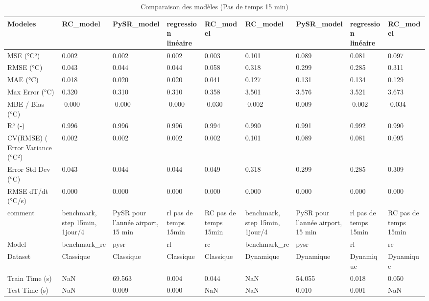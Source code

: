 \begin{table}
\caption{Comparaison des modèles (Pas de temps 15 min)}
\label{tab:tableau_15min}
\begin{tabular}{lllllllll}
\toprule
Modeles & RC_model & PySR_model & regression linéaire & RC_model & RC_model & PySR_model & regression linéaire & RC_model \\
\midrule
MSE (°C²) & 0.002 & 0.002 & 0.002 & 0.003 & 0.101 & 0.089 & 0.081 & 0.097 \\
RMSE (°C) & 0.043 & 0.044 & 0.044 & 0.058 & 0.318 & 0.299 & 0.285 & 0.311 \\
MAE (°C) & 0.018 & 0.020 & 0.020 & 0.041 & 0.127 & 0.131 & 0.134 & 0.129 \\
Max Error (°C) & 0.320 & 0.310 & 0.310 & 0.358 & 3.501 & 3.576 & 3.521 & 3.673 \\
MBE / Bias (°C) & -0.000 & -0.000 & -0.000 & -0.030 & -0.002 & 0.009 & -0.002 & -0.034 \\
R² (-) & 0.996 & 0.996 & 0.996 & 0.994 & 0.990 & 0.991 & 0.992 & 0.990 \\
CV(RMSE) (%
Error Variance (°C²) & 0.002 & 0.002 & 0.002 & 0.002 & 0.101 & 0.089 & 0.081 & 0.095 \\
Error Std Dev (°C) & 0.043 & 0.044 & 0.044 & 0.049 & 0.318 & 0.299 & 0.285 & 0.309 \\
RMSE dT/dt (°C/s) & 0.000 & 0.000 & 0.000 & 0.000 & 0.000 & 0.000 & 0.000 & 0.000 \\
comment & benchmark, step 15min, 1jour/4 & PySR pour l'année airport, 15 min & rl pas de temps 15min & RC pas de temps 15min & benchmark, step 15min, 1jour/4 & PySR pour l'année airport, 15 min & rl pas de temps 15min & RC pas de temps 15min \\
Model & benchmark_rc & pysr & rl & rc & benchmark_rc & pysr & rl & rc \\
Dataset & Classique & Classique & Classique & Classique & Dynamique & Dynamique & Dynamique & Dynamique \\
Train Time (s) & NaN & 69.563 & 0.004 & 0.044 & NaN & 54.055 & 0.018 & 0.050 \\
Test Time (s) & NaN & 0.009 & 0.000 & NaN & NaN & 0.010 & 0.001 & NaN \\
\bottomrule
\end{tabular}
\end{table}
